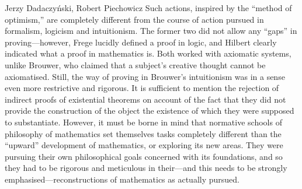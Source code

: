 \begin{artengenv}{Jerzy Dadaczyński, Robert Piechowicz}
Such actions, inspired by the ``method of optimism,'' are completely different from the course of action pursued in formalism, logicism and intuitionism. The former two did not allow any ``gaps'' in proving---however, Frege lucidly defined a proof in logic, and Hilbert clearly indicated what a proof in mathematics is. Both worked with axiomatic systems, unlike Brouwer, who claimed that a subject's creative thought cannot be axiomatised. Still, the way of proving in Brouwer's intuitionism was in a sense even more restrictive and rigorous. It is sufficient to mention the rejection of indirect proofs of existential theorems on account of the fact that they did not provide the construction of the object the existence of which they were supposed to substantiate. However, it must be borne in mind that normative schools of philosophy of mathematics set themselves tasks completely different than the ``upward'' development of mathematics, or exploring its new areas. They were pursuing their own philosophical goals concerned with its foundations, and so they had to be rigorous and meticulous in their---and this needs to be strongly emphasised---reconstructions of mathematics as actually pursued.


\end{artengenv}
